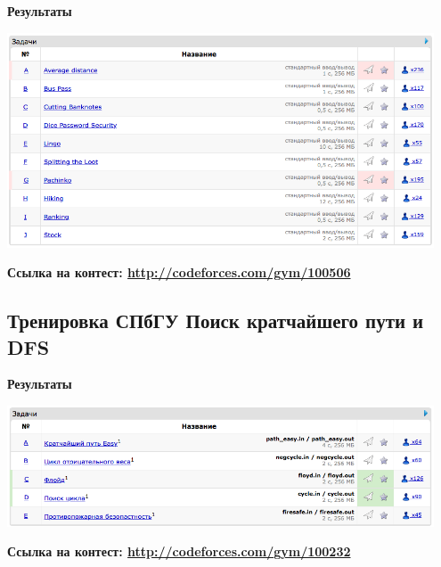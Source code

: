 \documentclass[a4paper,12pt]{article}
\begin{document}
\textbf{{\large Результаты}} \\
\begin{center}
\includegraphics[width=0.95\textwidth]{CT_S02E06/CT_S02E06_result.png}\\ [1cm]
\end{center}

\textbf{{\large Ссылка на контест: \url{http://codeforces.com/gym/100506}}}

%
%
\newpage
\subsection{Тренировка СПбГУ Поиск кратчайшего пути и DFS}

\textbf{{\large Результаты}} \\
\begin{center}
\includegraphics[width=0.95\textwidth]{SPBGU_GRAPHS/SPBGU_GRAPHS_result.png}\\ [1cm]
\end{center}

\textbf{{\large Ссылка на контест: \url{http://codeforces.com/gym/100232}}}
\end{document}
